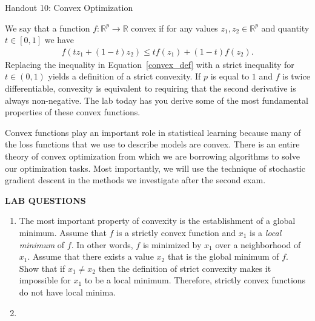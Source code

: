 \documentclass[12pt,hidelinks]{article}
\numberwithin{equation}{section}
\begin{document}
{\LARGE Handout 10: Convex Optimization}

\vspace*{18pt}

We say that a function $f: \mathbb{R}^p \rightarrow \mathbb{R} $ convex if
for any values $z_1, z_2 \in \mathbb{R}^p$ and quantity $t \in [0, 1]$ we have
\begin{align}
f(t z_1 + (1-t) z_2) \leq t f(z_1) + (1-t) f(z_2).
\end{align}
Replacing the inequality in Equation~\ref{convex_def} with a strict
inequality for $t \in (0, 1)$ yields a definition of a strict convexity. If
$p$ is equal to $1$ and $f$ is twice differentiable, convexity is equivalent to
requiring that the second derivative is always non-negative. The lab today
has you derive some of the most fundamental properties of these convex
functions.

Convex functions play an important role in statistical learning because many
of the loss functions that we use to describe models are convex. There is an
entire theory of convex optimization from which we are borrowing algorithms
to solve our optimization tasks. Most importantly, we will use the technique
of stochastic gradient descent in the methods we investigate after the second
exam.


\newpage

\textbf{LAB QUESTIONS}

\vspace*{0pt}

\begin{enumerate}
\item The most important property of convexity is the establishment of a global
minimum. Assume that $f$ is a strictly convex function and $x_1$ is a \textit{local
minimum} of $f$. In other words, $f$ is minimized by $x_1$ over a neighborhood
of $x_1$. Assume that there exists a value $x_2$ that is the global minimum of
$f$. Show that if $x_1 \neq x_2$ then the definition of strict convexity makes
it impossible for $x_1$ to be a local minimum. Therefore, strictly convex
functions do not have local minima.
\item
\end{enumerate}
\end{document}
